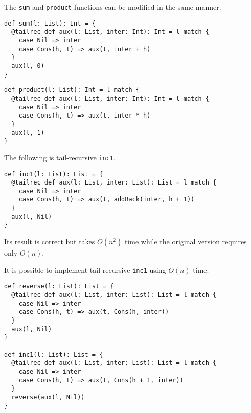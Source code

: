 The \verb!sum! and \verb!product! functions can be modified in the same manner.

\begin{verbatim}
def sum(l: List): Int = {
  @tailrec def aux(l: List, inter: Int): Int = l match {
    case Nil => inter
    case Cons(h, t) => aux(t, inter + h)
  }
  aux(l, 0)
}
\end{verbatim}

\begin{verbatim}
def product(l: List): Int = l match {
  @tailrec def aux(l: List, inter: Int): Int = l match {
    case Nil => inter
    case Cons(h, t) => aux(t, inter * h)
  }
  aux(l, 1)
}
\end{verbatim}

The following is tail-recursive \verb!inc1!.

\begin{verbatim}
def inc1(l: List): List = {
  @tailrec def aux(l: List, inter: List): List = l match {
    case Nil => inter
    case Cons(h, t) => aux(t, addBack(inter, h + 1))
  }
  aux(l, Nil)
}
\end{verbatim}

Its result is correct but takes \(O(n^2)\) time while the original version
requires only \(O(n)\).

It is possible to implement tail-recursive \verb!inc1! using \(O(n)\) time.

\begin{verbatim}
def reverse(l: List): List = {
  @tailrec def aux(l: List, inter: List): List = l match {
    case Nil => inter
    case Cons(h, t) => aux(t, Cons(h, inter))
  }
  aux(l, Nil)
}

def inc1(l: List): List = {
  @tailrec def aux(l: List, inter: List): List = l match {
    case Nil => inter
    case Cons(h, t) => aux(t, Cons(h + 1, inter))
  }
  reverse(aux(l, Nil))
}
\end{verbatim}
